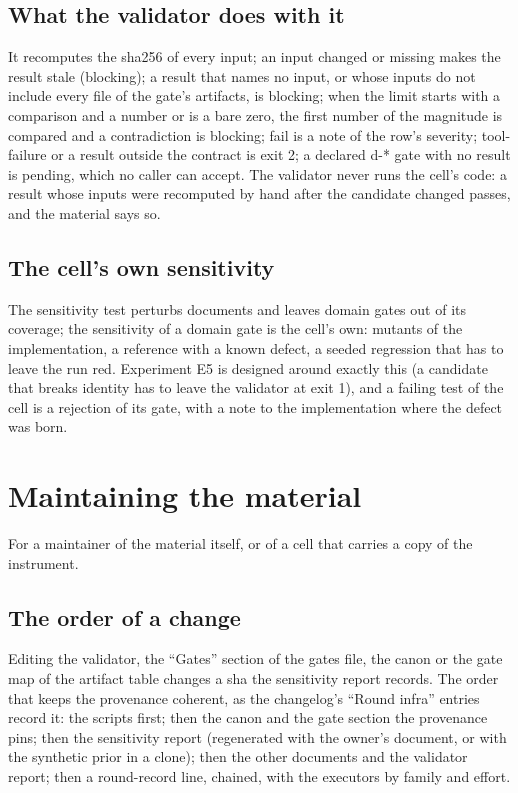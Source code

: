 \documentclass[
  american,
  10pt,
]{report}
\renewcommand{\texttt}[1]{{\ttfamily\hyphenchar\font=-1 #1}}
\begin{document}
\section{What the validator does with
it}\label{what-the-validator-does-with-it}

It recomputes the sha256 of every input; an input changed or missing
makes the result stale (blocking); a result that names no input, or
whose inputs do not include every file of the gate's artifacts, is
blocking; when the limit starts with a comparison and a number or is a
bare zero, the first number of the magnitude is compared and a
contradiction is blocking; \texttt{fail} is a note of the row's
severity; \texttt{tool-\allowbreak{}failure} or a result outside the
contract is exit 2; a declared \texttt{d-\allowbreak{}*} gate with no
result is pending, which no caller can accept. The validator never runs
the cell's code: a result whose inputs were recomputed by hand after the
candidate changed passes, and the material says so.

\section{The cell's own sensitivity}\label{the-cells-own-sensitivity}

The sensitivity test perturbs documents and leaves domain gates out of
its coverage; the sensitivity of a domain gate is the cell's own:
mutants of the implementation, a reference with a known defect, a seeded
regression that has to leave the run red. Experiment E5 is designed
around exactly this (a candidate that breaks identity has to leave the
validator at exit 1), and a failing test of the cell is a rejection of
its gate, with a note to the implementation where the defect was born.

\chapter{Maintaining the material}\label{maintaining-the-material}

For a maintainer of the material itself, or of a cell that carries a
copy of the instrument.

\section{The order of a change}\label{the-order-of-a-change}

Editing the validator, the ``Gates'' section of the gates file, the
canon or the gate map of the artifact table changes a sha the
sensitivity report records. The order that keeps the provenance
coherent, as the changelog's ``Round infra'' entries record it: the
scripts first; then the canon and the gate section the provenance pins;
then the sensitivity report (regenerated with the owner's document, or
with the synthetic prior in a clone); then the other documents and the
validator report; then a round-record line, chained, with the executors
by family and effort.
\end{document}
